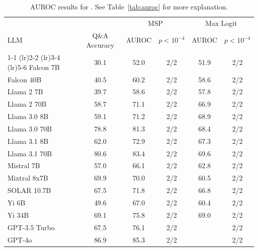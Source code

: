 \begin{table}[h]
\caption{AUROC results for . See Table~\ref{tab:auroc} for more explanation.}
\label{tab:auroc_max}
\centering
\begin{tabular}{lccccc}
\toprule
& & \multicolumn{2}{c}{MSP} & \multicolumn{2}{c}{Max Logit} \\ 
LLM & Q\&A Accuracy & AUROC & $p < 10^{-4}$ & AUROC & $p < 10^{-4}$ \\ 
\cmidrule(lr){1-1} \cmidrule(lr){2-2} \cmidrule(lr){3-4} \cmidrule(lr){5-6} 
Falcon 7B & 30.1 & 52.0 & 2/2 & 51.9 & 2/2\\
Falcon 40B & 40.5 & 60.2 & 2/2 & 58.6 & 2/2\\
Llama 2 7B & 39.7 & 58.6 & 2/2 & 57.8 & 2/2\\
Llama 2 70B & 58.7 & 71.1 & 2/2 & 66.9 & 2/2\\
Llama 3.0 8B & 59.1 & 71.2 & 2/2 & 68.9 & 2/2\\
Llama 3.0 70B & 78.8 & 81.3 & 2/2 & 68.4 & 2/2\\
Llama 3.1 8B & 62.0 & 72.9 & 2/2 & 67.3 & 2/2\\
Llama 3.1 70B & 80.6 & 83.4 & 2/2 & 69.6 & 2/2\\
Mistral 7B & 57.0 & 66.1 & 2/2 & 62.8 & 2/2\\
Mixtral 8x7B & 69.9 & 70.0 & 2/2 & 60.5 & 2/2\\
SOLAR 10.7B & 67.5 & 71.8 & 2/2 & 66.8 & 2/2\\
Yi 6B & 49.6 & 67.0 & 2/2 & 60.4 & 2/2\\
Yi 34B & 69.1 & 75.8 & 2/2 & 69.0 & 2/2\\
GPT-3.5 Turbo & 67.5 & 76.1 & 2/2 &  & 2/2\\
GPT-4o & 86.9 & 85.3 & 2/2 &  & 2/2\\
\bottomrule
\end{tabular}
\end{table}
